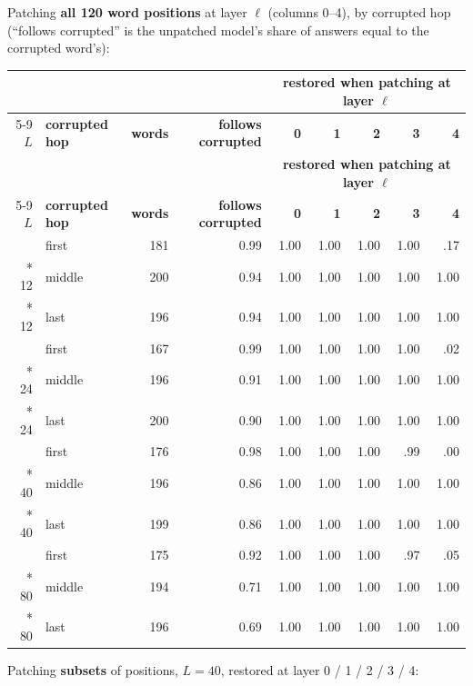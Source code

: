 \documentclass[paper=a4,fontsize=11pt,DIV=11,parskip=half,headings=small,numbers=noendperiod]{scrartcl}
\DeclareRobustCommand{\hdr}[1]{\textsf{\bfseries #1}}
\begin{document}
Patching \textbf{all 120 word positions} at layer $\ell$ (columns 0–4), by corrupted
hop (“follows corrupted” is the unpatched model’s share of answers equal to the corrupted word’s):

{\small\nopagebreak[4]
\begin{longtable}{@{}r l r r *{5}{r}@{}}
\toprule
& & & & \multicolumn{5}{c}{\hdr{restored when patching at layer $\ell$}} \\
\cmidrule(lr){5-9}
\hdr{$L$} & \hdr{corrupted hop} & \hdr{words} & \hdr{follows corrupted} & \hdr{0} & \hdr{1} & \hdr{2} & \hdr{3} & \hdr{4} \\
\midrule
\endfirsthead
\toprule
& & & & \multicolumn{5}{c}{\hdr{restored when patching at layer $\ell$}} \\
\cmidrule(lr){5-9}
\hdr{$L$} & \hdr{corrupted hop} & \hdr{words} & \hdr{follows corrupted} & \hdr{0} & \hdr{1} & \hdr{2} & \hdr{3} & \hdr{4} \\
\midrule
\endhead
\bottomrule
\endlastfoot
12 & first & 181 & 0.99 & 1.00 & 1.00 & 1.00 & 1.00 & .17 \\*
12 & middle & 200 & 0.94 & 1.00 & 1.00 & 1.00 & 1.00 & 1.00 \\*
12 & last & 196 & 0.94 & 1.00 & 1.00 & 1.00 & 1.00 & 1.00 \\
\addlinespace[4pt]
24 & first & 167 & 0.99 & 1.00 & 1.00 & 1.00 & 1.00 & .02 \\*
24 & middle & 196 & 0.91 & 1.00 & 1.00 & 1.00 & 1.00 & 1.00 \\*
24 & last & 200 & 0.90 & 1.00 & 1.00 & 1.00 & 1.00 & 1.00 \\
\addlinespace[4pt]
40 & first & 176 & 0.98 & 1.00 & 1.00 & 1.00 & .99 & .00 \\*
40 & middle & 196 & 0.86 & 1.00 & 1.00 & 1.00 & 1.00 & 1.00 \\*
40 & last & 199 & 0.86 & 1.00 & 1.00 & 1.00 & 1.00 & 1.00 \\
\addlinespace[4pt]
80 & first & 175 & 0.92 & 1.00 & 1.00 & 1.00 & .97 & .05 \\*
80 & middle & 194 & 0.71 & 1.00 & 1.00 & 1.00 & 1.00 & 1.00 \\*
80 & last & 196 & 0.69 & 1.00 & 1.00 & 1.00 & 1.00 & 1.00 \\
\end{longtable}}

Patching \textbf{subsets} of positions, $L=40$, restored at layer 0 / 1 / 2 / 3 / 4:
\end{document}
